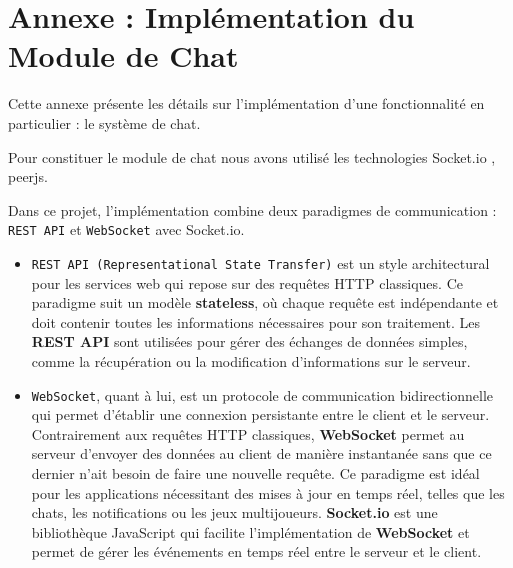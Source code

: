 \chapter*{Annexe : Implémentation du Module de Chat}

\makeatletter
\renewcommand{\thesection}{\@arabic\c@section}
\makeatother

\setcounter{section}{0}

Cette annexe présente les détails sur l'implémentation d'une fonctionnalité en particulier : le système de chat.

\vspace{0.35cm}

Pour constituer le module de chat nous avons utilisé les technologies Socket.io , peerjs.

Dans ce projet, l'implémentation combine deux paradigmes de communication : \verb|REST API| et \verb|WebSocket| avec Socket.io.

\begin{itemize}
    \item  \verb|REST API (Representational State Transfer)| est un style architectural pour les services web qui repose sur des requêtes HTTP classiques. Ce paradigme suit un modèle \textbf{stateless}, où chaque requête est indépendante et doit contenir toutes les informations nécessaires pour son traitement. Les \textbf{REST API} sont utilisées pour gérer des échanges de données simples, comme la récupération ou la modification d'informations sur le serveur.
    \item \verb|WebSocket|, quant à lui, est un protocole de communication bidirectionnelle qui permet d'établir une connexion persistante entre le client et le serveur. Contrairement aux requêtes HTTP classiques, \textbf{WebSocket} permet au serveur d'envoyer des données au client de manière instantanée sans que ce dernier n'ait besoin de faire une nouvelle requête. Ce paradigme est idéal pour les applications nécessitant des mises à jour en temps réel, telles que les chats, les notifications ou les jeux multijoueurs. \textbf{Socket.io} est une bibliothèque JavaScript qui facilite l'implémentation de \textbf{WebSocket} et permet de gérer les événements en temps réel entre le serveur et le client.
\end{itemize}

